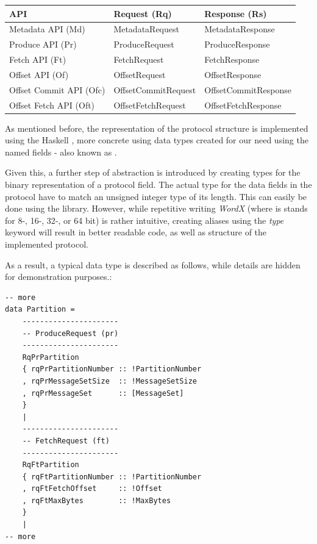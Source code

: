 \begin{table}[h]
\centering
\begin{tabular}{|l|l|l|}
\hline
\textbf{API}            & \textbf{Request (Rq)} & \textbf{Response (Rs)} \\ \hline
Metadata API (Md)       & MetadataRequest       & MetadataResponse       \\ \hline
Produce API (Pr)        & ProduceRequest        & ProduceResponse        \\ \hline
Fetch API (Ft)          & FetchRequest          & FetchResponse          \\ \hline
Offset API (Of)         & OffsetRequest         & OffsetResponse         \\ \hline
Offset Commit API (Ofc) & OffsetCommitRequest   & OffsetCommitResponse   \\ \hline
Offset Fetch API (Oft)  & OffsetFetchRequest    & OffsetFetchResponse    \\ \hline
\end{tabular}
\end{table}

As mentioned before, the representation of the protocol structure is
implemented using the Haskell , more concrete using data types created
for our need using the named fields - also known as .

Given this, a further step of abstraction is introduced by creating types for
the binary representation of a protocol field. The actual type for the data
fields in the protocol have to match an unsigned integer type of its length.
This can easily be done using the
library. However, while repetitive writing \textit{WordX} (where is stands for
8-, 16-, 32-, or 64 bit) is rather intuitive, creating aliases using the
\textit{type} keyword will result in better readable code, as well as structure
of the implemented protocol.

As a result, a typical data type is described as follows, while details are
hidden for demonstration purposes.:

\begin{lstlisting}
-- more
data Partition =
    ----------------------
    -- ProduceRequest (pr)
    ----------------------
    RqPrPartition
    { rqPrPartitionNumber :: !PartitionNumber
    , rqPrMessageSetSize  :: !MessageSetSize
    , rqPrMessageSet      :: [MessageSet]
    }
    |
    ----------------------
    -- FetchRequest (ft)
    ----------------------
    RqFtPartition
    { rqFtPartitionNumber :: !PartitionNumber
    , rqFtFetchOffset     :: !Offset
    , rqFtMaxBytes        :: !MaxBytes
    }
    |
-- more
\end{lstlisting}


